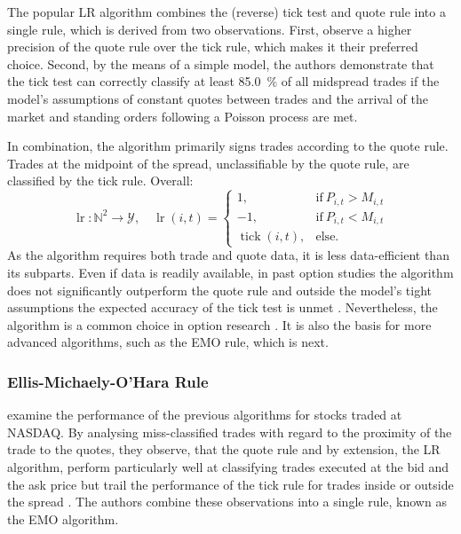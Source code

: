 The popular \gls{LR} algorithm \autocite[][745]{leeInferringTradeDirection1991} combines the (reverse) tick test and quote rule into a single rule, which is derived from two observations. First, \textcite[][735--743]{leeInferringTradeDirection1991} observe a higher precision of the quote rule over the tick rule, which makes it their preferred choice. Second, by the means of a simple model, the authors demonstrate that the tick test can correctly classify at least \SI{85.0}{\percent} of all midspread trades if the model's assumptions of constant quotes between trades and the arrival of the market and standing orders following a Poisson process are met.

In combination, the algorithm primarily signs trades according to the quote rule. Trades at the midpoint of the spread, unclassifiable by the quote rule, are classified by the tick rule. Overall:
\begin{equation}
    \operatorname{lr} \colon \mathbb{N}^2 \to \mathcal{Y},\quad\operatorname{lr}(i,t)=
    \begin{cases}
        1,                         & \mathrm{if}\ P_{i, t} > M_{i, t} \\
        -1,                        & \mathrm{if}\ P_{i, t} < M_{i, t} \\
        \operatorname{tick}(i, t), & \mathrm{else}.
    \end{cases}
\end{equation}
As the algorithm requires both trade and quote data, it is less data-efficient than its subparts. Even if data is readily available, in past option studies the algorithm does not significantly outperform the quote rule and outside the model's tight assumptions the expected accuracy of the tick test is unmet \autocites[][30--32]{grauerOptionTradeClassification2022}[][886]{savickasInferringDirectionOption2003}. Nevertheless, the algorithm is a common choice in option research \autocite[cp.][453]{easleyOptionVolumeStock1998}. It is also the basis for more advanced algorithms, such as the \gls{EMO} rule, which is next.

\subsubsection{Ellis-Michaely-O'Hara
    Rule}\label{sec:ellis-michaely-ohara-rule}

\textcite[][536]{ellisAccuracyTradeClassification2000} examine the performance of the previous algorithms for stocks traded at \gls{NASDAQ}. By analysing miss-classified trades with regard to the proximity of the trade to the quotes, they observe, that the quote rule and by extension, the \gls{LR} algorithm, perform particularly well at classifying trades executed at the bid and the ask price but trail the performance of the tick rule for trades inside or outside the spread \autocite[][535--536]{ellisAccuracyTradeClassification2000}. The authors combine these observations into a single rule, known as the \gls{EMO} algorithm.


